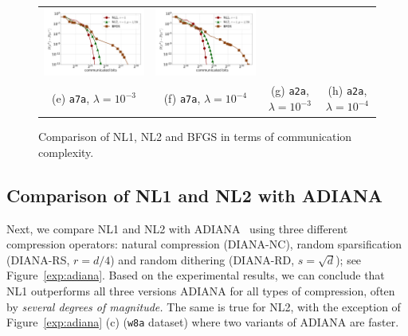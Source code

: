 \documentclass[10pt]{article}
\begin{document}
\begin{figure}[ht]
\begin{center}
{\begin{tabular}{cccc}
				\includegraphics[width = 0.23 \textwidth]{LogReg/a2a/Lambda=1e-3/a2a_nl1_nl2_bfgs_bits_lmb=0.001.pdf}&
				\includegraphics[width = 0.23 \textwidth]{LogReg/a2a/Lambda=1e-4/a2a_nl1_nl2_bfgs_bits_lmb=0.0001.pdf}
				\\
				(e) {\tt a7a}, $\lambda=10^{-3}$ &(f) {\tt a7a}, $\lambda=10^{-4}$ & (g) {\tt a2a}, $\lambda=10^{-3}$ &(h) {\tt a2a}, $\lambda=10^{-4}$
		\end{tabular}}
		\caption{Comparison of {\sf NL1}, {\sf NL2} and BFGS in terms of communication complexity.}
		\label{exp:bfgs}
	\end{center}
\end{figure}








\subsection{Comparison of {\sf NL1} and {\sf NL2} with ADIANA}

Next, we compare {\sf NL1} and {\sf NL2} with ADIANA~\citep{ADIANA} using three different compression operators: natural compression (DIANA-NC),  random sparsification (DIANA-RS, $r = d/4$) and random dithering (DIANA-RD, $s = \sqrt{d}$); see Figure~\ref{exp:adiana}. Based on the experimental results, we can conclude that {\sf NL1} outperforms all three versions ADIANA for all types of compression, often by {\em several degrees of magnitude.} The same is true for  {\sf NL2}, with the exception of Figure~\ref{exp:adiana} (c) ({\tt w8a} dataset) where two variants of ADIANA are faster.
\end{document}
